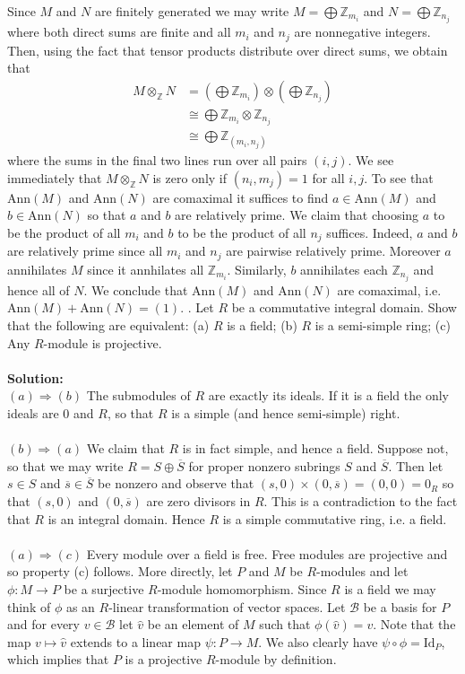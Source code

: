 \documentclass[11pt]{article}
\newcommand{\Z}{\mathbb{Z}}
\begin{document}
Since $M$ and $N$ are finitely generated we may write $M = \bigoplus \Z_{m_i}$ and $N = \bigoplus \Z_{n_j}$ where both direct sums are finite and all $m_i$ and $n_j$ are nonnegative integers. Then, using the fact that tensor products distribute over direct sums, we obtain that \begin{align*}
M\otimes_\Z N & = \left(\bigoplus \Z_{m_i}\right) \otimes \left(\bigoplus \Z_{n_j}\right)\\
&\cong \bigoplus \Z_{m_i}\otimes \Z_{n_j}\\
& \cong \bigoplus \Z_{(m_i,n_j)}
\end{align*}
where the sums in the final two lines run over all pairs $(i,j)$. We see immediately that $M \otimes_\Z N$ is zero only if $(n_i,m_j) = 1$ for all $i,j$. To see that $\mbox{Ann}(M)$ and $\mbox{Ann}(N)$ are comaximal it suffices to find $a\in \mbox{Ann}(M)$ and $b\in\mbox{Ann}(N)$ so that $a$ and $b$ are relatively prime. We claim that choosing $a$ to be the product of all $m_i$ and $b$ to be the product of all $n_j$ suffices. Indeed, $a$ and $b$ are relatively prime since all $m_i$ and $n_j$ are pairwise relatively prime. Moreover $a$ annihilates $M$ since it annhilates all $\Z_{m_i}$. Similarly, $b$ annihilates each $\Z_{n_j}$ and hence all of $N$. We conclude that $\mbox{Ann}(M)$ and $\mbox{Ann}(N)$ are comaximal, i.e. $\mbox{Ann}(M) + \mbox{Ann}(N) = (1)$.
. Let $R$ be a commutative integral domain. Show that the following are equivalent:
(a) $R$ is a field;
(b) $R$ is a semi-simple ring;
(c) Any $R$-module is projective.\\\\
\textbf{Solution:}\\
$(a)\Rightarrow (b)$ The submodules of $R$ are exactly its ideals. If it is a field the only ideals are $0$ and $R$, so that $R$ is a simple (and hence semi-simple) right.\\\\
$(b)\Rightarrow (a)$ We claim that $R$ is in fact simple, and hence a field. Suppose not, so that we may write $R = S\oplus \overline {S}$ for proper nonzero subrings $S$ and $\overline{S}$. Then let $s\in S$ and $\overline{s}\in \overline{S}$ be nonzero and observe that $(s,0)\times (0,\overline{s}) = (0,0) = 0_R$ so that $(s,0)$ and $(0,\overline{s})$ are zero divisors in $R$. This is a contradiction to the fact that  $R$ is an integral domain. Hence $R$ is a simple commutative ring, i.e. a field. \\\\
$(a)\Rightarrow (c)$ Every module over a field is free. Free modules are projective and so property (c) follows. More directly, let $P$ and $M$ be $R$-modules and let $\phi:M\to P$ be a surjective $R$-module homomorphism. Since $R$ is a field we may think of $\phi$ as an $R$-linear transformation of vector spaces. Let $\mathcal B$ be a basis for $P$ and for every $v\in \mathcal B$ let $\hat{v}$ be an element of $M$ such that $\phi(\hat{v}) = v$. Note that the map $v\mapsto \hat{v}$ extends to a linear map $\psi:P\to M$. We also clearly have $\psi\circ \phi = \mbox{Id}_P$, which implies that $P$ is a projective $R$-module by definition.\\\\
\end{document}
